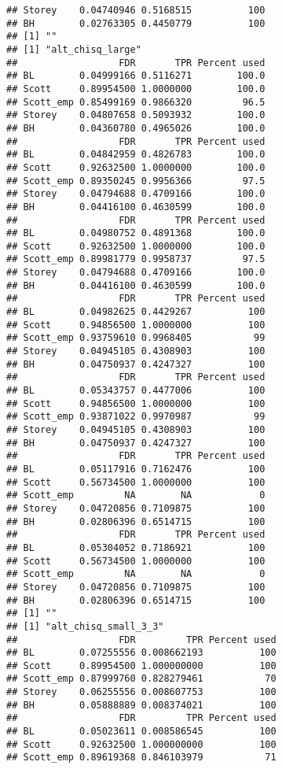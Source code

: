 \documentclass{article}\usepackage[]{graphicx}\usepackage[]{color}
\makeatletter
\newenvironment{kframe}{%
 \def\at@end@of@kframe{}%
 \ifinner\ifhmode%
  \def\at@end@of@kframe{\end{minipage}}%
  \begin{minipage}{\columnwidth}%
 \fi\fi%
 \def\FrameCommand##1{\hskip\@totalleftmargin \hskip-\fboxsep
 \colorbox{shadecolor}{##1}\hskip-\fboxsep
     \hskip-\linewidth \hskip-\@totalleftmargin \hskip\columnwidth}%
 \MakeFramed {\advance\hsize-\width
   \@totalleftmargin\z@ \linewidth\hsize
   \@setminipage}}%
 {\par\unskip\endMakeFramed%
 \at@end@of@kframe}
\newenvironment{knitrout}{}{} %
\makeatother
\begin{document}
\begin{knitrout}
\begin{kframe}
\begin{verbatim}
## Storey    0.04740946 0.5168515          100
## BH        0.02763305 0.4450779          100
## [1] ""
## [1] "alt_chisq_large"
##                  FDR       TPR Percent used
## BL        0.04999166 0.5116271        100.0
## Scott     0.89954500 1.0000000        100.0
## Scott_emp 0.85499169 0.9866320         96.5
## Storey    0.04807658 0.5093932        100.0
## BH        0.04360780 0.4965026        100.0
##                  FDR       TPR Percent used
## BL        0.04842959 0.4826783        100.0
## Scott     0.92632500 1.0000000        100.0
## Scott_emp 0.89350245 0.9956366         97.5
## Storey    0.04794688 0.4709166        100.0
## BH        0.04416100 0.4630599        100.0
##                  FDR       TPR Percent used
## BL        0.04980752 0.4891368        100.0
## Scott     0.92632500 1.0000000        100.0
## Scott_emp 0.89981779 0.9958737         97.5
## Storey    0.04794688 0.4709166        100.0
## BH        0.04416100 0.4630599        100.0
##                  FDR       TPR Percent used
## BL        0.04982625 0.4429267          100
## Scott     0.94856500 1.0000000          100
## Scott_emp 0.93759610 0.9968405           99
## Storey    0.04945105 0.4308903          100
## BH        0.04750937 0.4247327          100
##                  FDR       TPR Percent used
## BL        0.05343757 0.4477006          100
## Scott     0.94856500 1.0000000          100
## Scott_emp 0.93871022 0.9970987           99
## Storey    0.04945105 0.4308903          100
## BH        0.04750937 0.4247327          100
##                  FDR       TPR Percent used
## BL        0.05117916 0.7162476          100
## Scott     0.56734500 1.0000000          100
## Scott_emp         NA        NA            0
## Storey    0.04720856 0.7109875          100
## BH        0.02806396 0.6514715          100
##                  FDR       TPR Percent used
## BL        0.05304052 0.7186921          100
## Scott     0.56734500 1.0000000          100
## Scott_emp         NA        NA            0
## Storey    0.04720856 0.7109875          100
## BH        0.02806396 0.6514715          100
## [1] ""
## [1] "alt_chisq_small_3_3"
##                  FDR         TPR Percent used
## BL        0.07255556 0.008662193          100
## Scott     0.89954500 1.000000000          100
## Scott_emp 0.87999760 0.828279461           70
## Storey    0.06255556 0.008607753          100
## BH        0.05888889 0.008374021          100
##                  FDR         TPR Percent used
## BL        0.05023611 0.008586545          100
## Scott     0.92632500 1.000000000          100
## Scott_emp 0.89619368 0.846103979           71

\end{verbatim}
\end{kframe}
\end{knitrout}
\end{document}
